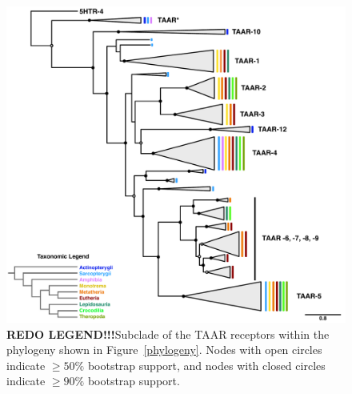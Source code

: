 \documentclass[fleqn,10pt]{wlpeerj}
\begin{document}
\begin{figure}[htbp]
	\centerline{\includegraphics[width=15cm]{figures/taar_revision_taxonomy.pdf}}
	\caption{\label{taar_tree} \textbf{REDO LEGEND!!!}Subclade of the TAAR receptors within the phylogeny shown in Figure~\ref{phylogeny}. Nodes with open circles indicate $\geq 50\%$ bootstrap support, and nodes with closed circles indicate $\geq 90\%$ bootstrap support. \color{blue}{include caprid, rodent specific clade information somehow!} }
\end{figure}
\end{document}
